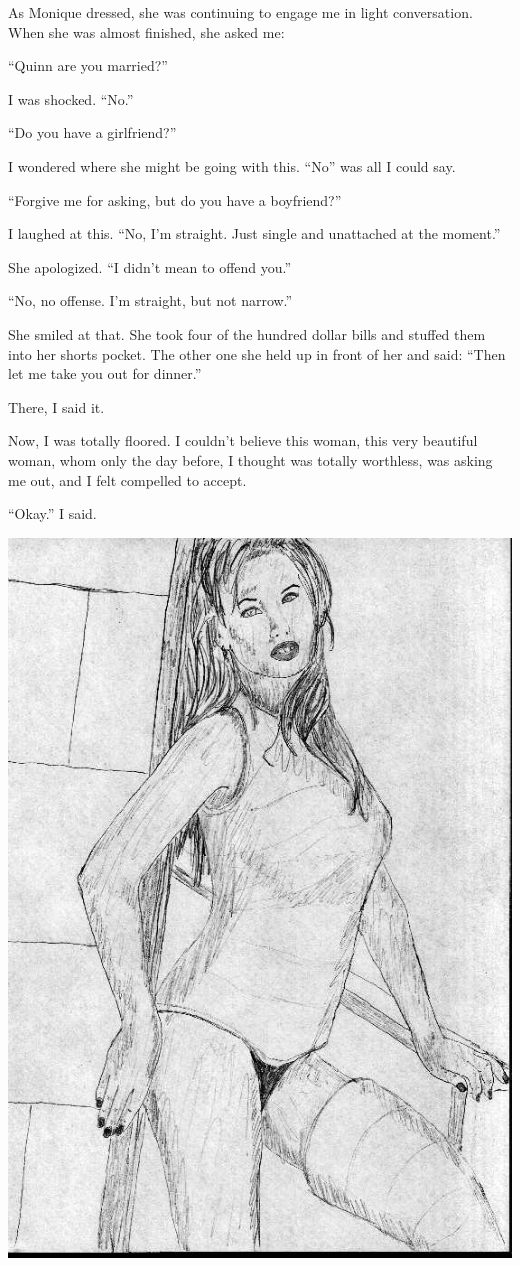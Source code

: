 As Monique dressed, she was continuing to engage me in light conversation. When she was
almost finished, she asked me:

``Quinn are you married?''

I was shocked. ``No.''

``Do you have a girlfriend?''

I wondered where she might be going with this. ``No'' was all I could say.

``Forgive me for asking, but do you have a boyfriend?''

I laughed at this. ``No, I'm straight. Just single and unattached at the moment.''

She apologized. ``I didn't mean to offend you.''

``No, no offense. I'm straight, but not narrow.''

She smiled at that. She took four of the hundred dollar bills and stuffed them into her
shorts pocket. The other one she held up in front of her and said: ``Then let me take you out
for
dinner.''

\begin{thought}
There, I said it.
\end{thought}

Now, I was totally floored. I couldn't believe this woman, this very beautiful woman, whom
only the day before, I thought was totally worthless, was asking me out, and I felt compelled to
accept.

``Okay.'' I said.

\begin{center}
\includegraphics{images/kicks11.jpg}
\end{center}
